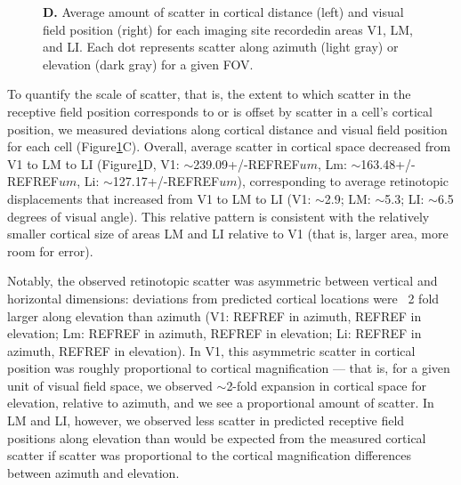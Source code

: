 \begin{figure}[t!]
{    \textbf{D.} Average amount of scatter in cortical distance (left) and visual field position (right) for each imaging site recordedin areas V1, LM, and LI. Each dot represents scatter along azimuth (light gray) or elevation (dark gray) for a given FOV.
    \label{fig:retino_scatter}}
\end{figure}

To quantify the scale of scatter, that is, the extent to which scatter in the receptive field position corresponds to or is offset by scatter in a cell's cortical position, we measured deviations along cortical distance and visual field position for each cell (Figure\ref{fig:retino_scatter}C). Overall, average scatter in cortical space decreased from V1 to LM to LI (Figure\ref{fig:retino_scatter}D, V1: $\sim$239.09+/-REFREF$um$, Lm: $\sim$163.48+/-REFREF$um$, Li: $\sim$127.17+/-REFREF$um$), corresponding to average retinotopic displacements that increased from V1 to LM to LI (V1: $\sim$2.9; LM: $\sim$5.3; LI: $\sim$6.5 degrees of visual angle). This relative pattern is consistent with the relatively smaller cortical size of areas LM and LI relative to V1 (that is, larger area, more room for error).  

Notably, the observed retinotopic scatter was asymmetric between vertical and horizontal dimensions:  deviations from predicted cortical locations were ~2 fold larger along elevation than azimuth (V1: REFREF in azimuth, REFREF in elevation; Lm: REFREF in azimuth, REFREF in elevation; Li: REFREF in azimuth, REFREF in elevation). In V1, this asymmetric scatter in cortical position was roughly proportional to cortical magnification --- that is, for a given unit of visual field space, we observed $\sim$2-fold expansion in cortical space  for elevation, relative to azimuth, and we see a proportional amount of scatter. In LM and LI, however, we observed less scatter in predicted receptive field positions along elevation than would be expected from the measured cortical scatter if scatter was proportional to the cortical magnification differences between azimuth and elevation.


